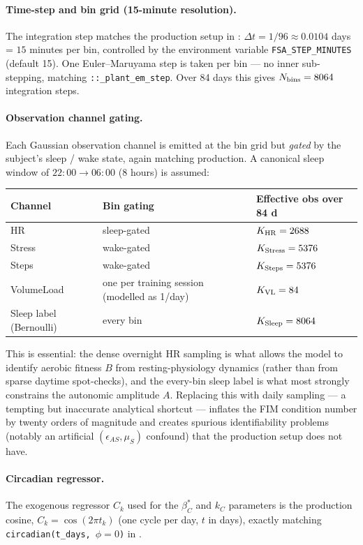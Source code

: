 \paragraph{Time-step and bin grid (15-minute resolution).}
The integration step matches the production setup in : $\Delta t = 1 / 96 \approx 0.0104$ days = $15$ minutes per bin, controlled by the environment variable \texttt{FSA\_STEP\_MINUTES} (default 15). One Euler--Maruyama step is taken per bin --- no inner sub-stepping, matching \verb|::_plant_em_step|. Over 84 days this gives $N_{\rm bins} = 8064$ integration steps.

\paragraph{Observation channel gating.}
Each Gaussian observation channel is emitted at the bin grid but \emph{gated} by the subject's sleep / wake state, again matching production. A canonical sleep window of $22{:}00\to 06{:}00$ (8 hours) is assumed:
\begin{center}
\begin{tabular}{lll}
\toprule
Channel & Bin gating & Effective obs over 84 d \\
\midrule
HR        & sleep-gated  &  $K_{\rm HR}     = 2688$ \\
Stress    & wake-gated   &  $K_{\rm Stress} = 5376$ \\
Steps     & wake-gated   &  $K_{\rm Steps}  = 5376$ \\
VolumeLoad & one per training session (modelled as 1/day) & $K_{\rm VL} = 84$ \\
Sleep label (Bernoulli) & every bin & $K_{\rm Sleep} = 8064$ \\
\bottomrule
\end{tabular}
\end{center}
This is essential: the dense overnight HR sampling is what allows the model to identify aerobic fitness $B$ from resting-physiology dynamics (rather than from sparse daytime spot-checks), and the every-bin sleep label is what most strongly constrains the autonomic amplitude $A$. Replacing this with daily sampling --- a tempting but inaccurate analytical shortcut --- inflates the FIM condition number by twenty orders of magnitude and creates spurious identifiability problems (notably an artificial $(\epsilon_{AS}, \mu_S)$ confound) that the production setup does not have.

\paragraph{Circadian regressor.}
The exogenous regressor $C_k$ used for the $\beta_C^*$ and $k_C$ parameters is the production cosine, $C_k = \cos(2\pi t_k)$ (one cycle per day, $t$ in days), exactly matching \texttt{circadian(t\_days, $\phi=0$)} in .

